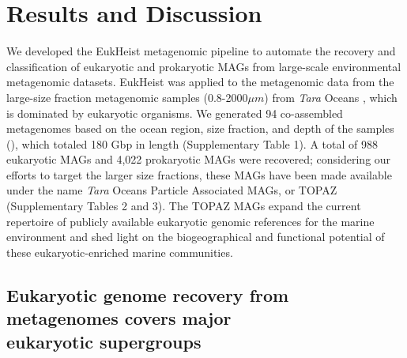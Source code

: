 \documentclass[12pt]{article}
\numberwithin{equation}{section}
\begin{document}
\section*{Results and Discussion}

We developed the EukHeist metagenomic pipeline to automate the recovery and classification of eukaryotic and prokaryotic MAGs from large-scale environmental metagenomic datasets. EukHeist was applied to the metagenomic data from the large-size fraction metagenomic samples (0.8-2000$\mu m$)  from \textit{Tara} Oceans \citep{Carradec2018global}, which is dominated by eukaryotic organisms. We generated 94 co-assembled metagenomes based on the ocean region, size fraction, and depth of the samples (), which totaled 180 Gbp in length (Supplementary Table 1).  A total of 988 eukaryotic MAGs and 4,022 prokaryotic MAGs were recovered; considering our efforts to target the larger size fractions, these MAGs have been made available under the name \textit{Tara} Oceans Particle Associated MAGs, or TOPAZ (Supplementary Tables 2 and 3). The TOPAZ MAGs expand the current repertoire of publicly available eukaryotic genomic references for the marine environment and shed light on the biogeographical and functional potential of these eukaryotic-enriched marine communities. 

\subsection*{Eukaryotic genome recovery from metagenomes covers major \\ eukaryotic supergroups}
\end{document}
